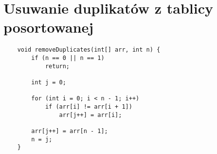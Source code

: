\documentclass[algorytmy.tex]{subfiles}
\begin{document}
    \section{Usuwanie duplikatów z tablicy posortowanej}
    \begin{verbatim}
    void removeDuplicates(int[] arr, int n) {
        if (n == 0 || n == 1)
            return;

        int j = 0;

        for (int i = 0; i < n - 1; i++)
            if (arr[i] != arr[i + 1])
                arr[j++] = arr[i];

        arr[j++] = arr[n - 1];
        n = j;
    }
   \end{verbatim}

\end{document}
